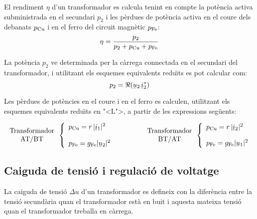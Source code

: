 El rendiment $\eta$ d'un transformador es calcula tenint en compte la pot\`{e}ncia activa subministrada en el secundari $p_2$ i les p\`{e}rdues de pot\`{e}ncia activa en el coure dels debanats $p_\mathrm{Cu}$ i en el ferro del circuit magn\`{e}tic $p_\mathrm{Fe}$:
\begin{equation}
    \eta = \frac{p_2}{p_2 + p_\mathrm{Cu} + p_\mathrm{Fe}}
\end{equation}

La pot\`{e}ncia $p_2$ ve determinada per la c\`{a}rrega connectada en el secundari del transformador, i utilitzant els esquemes equivalents redu\"{\i}ts es pot calcular com:
\begin{equation}
    p_2 = \Re(\cmplx{u}_2 \,\cmplx{i}_2^*)
\end{equation}

Les p\`{e}rdues de pot\`{e}ncies  en el coure i en el ferro es calculen, utilitzant els esquemes equivalents redu\"{\i}ts en {"<}L{">}, a partir de les expressions seg\"{u}ents:

\begin{equation}
\begin{array}{c}\text{Transformador}\\
\text{AT/BT}
\end{array} \left\{
\begin{array}{l}
   p\ped{Cu} = r \,|\cmplx{i}_1|^2 \\[2.7ex]
   p\ped{Fe} = g\ped{Fe} |\cmplx{u}_2|^2
\end{array}
\right. \qquad\qquad
\begin{array}{c}\text{Transformador}\\
\text{BT/AT}
\end{array} \left\{
\begin{array}{l}
   p\ped{Cu} = r \,|\cmplx{i}_2|^2 \\[2.5ex]
   p\ped{Fe} = g\ped{Fe} |\cmplx{u}_1|^2
\end{array}
\right.
\end{equation}

\subsection{Caiguda de tensi\'{o} i regulaci\'{o} de voltatge}

La caiguda de tensi\'{o} $\Delta u$ d'un transformador  es defineix con la difer\`{e}ncia entre la tensi\'{o} secund\`{a}ria quan el transformador est\`{a} en buit i aquesta mateixa tensi\'{o} quan el transformador treballa en c\`{a}rrega.

